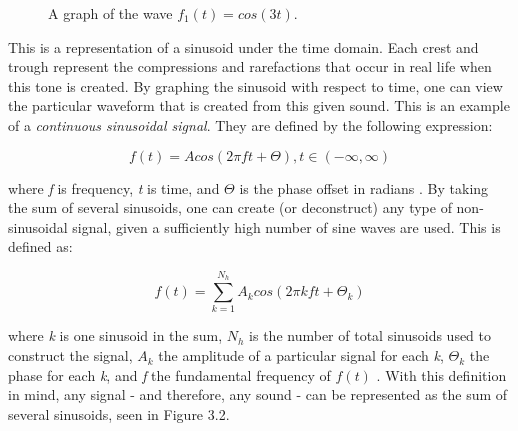 \begin{figure}[h] %
\begin{center}
	\caption{A graph of the wave \(f_1(t) = cos(3t)\).}
\end{center}
\end{figure}

This is a representation of a sinusoid under the time domain. Each crest and trough represent the compressions and rarefactions that occur in real life when this tone is created. By graphing the sinusoid with respect to time, one can view the particular waveform that is created from this given sound. This is an example of a \textit{continuous sinusoidal signal}. They are defined by the following expression:

\begin{defn}\label{def1}
	\begin{equation}\label{introf(t)}
	f(t)=Acos(2\pi ft + \varTheta), t \in (-\infty, \infty)
\end{equation}\end{defn}

where \textit{f} is frequency, \textit{t} is time, and $\varTheta$ is the phase offset in radians \cite{Symons_2013}. By taking the sum of several sinusoids, one can create (or deconstruct) any type of non-sinusoidal signal, given a sufficiently high number of sine waves are used. This is defined as:

\begin{defn}\label{def2}
	\begin{equation}\label{intro2f(t)}
	f(t)=\sum_{k=1}^{N_h} A_k cos(2\pi kft + \varTheta_k)
\end{equation}\end{defn}

where \textit{k} is one sinusoid in the sum, $N_h$ is the number of total sinusoids used to construct the signal, $A_k$ the amplitude of a particular signal for each \textit{k}, $\varTheta_k$ the phase for each \textit{k}, and \textit{f} the fundamental frequency of $f(t)$ \cite{Symons_2013}. With this definition in mind, any signal - and therefore, any sound - can be represented as the sum of several sinusoids, seen in Figure 3.2.

